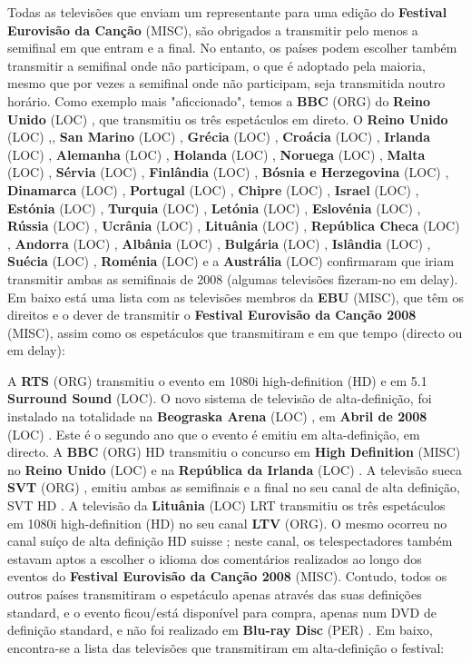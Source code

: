 \documentclass[12pt,a4paper]{article}
\begin{document}
Todas as televisões que enviam um representante para uma edição do \textbf{Festival Eurovisão da Canção} (MISC), são obrigados a transmitir pelo menos a semifinal em que entram e a final. No entanto, os países podem escolher também transmitir a semifinal onde não participam, o que é adoptado pela maioria, mesmo que por vezes a semifinal onde não participam, seja transmitida noutro horário. Como exemplo mais "aficcionado", temos a \textbf{BBC} (ORG) do \textbf{Reino Unido} (LOC) , que transmitiu os três espetáculos em direto. O \textbf{Reino Unido} (LOC) ,, \textbf{San Marino} (LOC) , \textbf{Grécia} (LOC) , \textbf{Croácia} (LOC) , \textbf{Irlanda} (LOC) , \textbf{Alemanha} (LOC) , \textbf{Holanda} (LOC) , \textbf{Noruega} (LOC) , \textbf{Malta} (LOC) , \textbf{Sérvia} (LOC) , \textbf{Finlândia} (LOC) , \textbf{Bósnia e Herzegovina} (LOC) , \textbf{Dinamarca} (LOC) , \textbf{Portugal} (LOC) , \textbf{Chipre} (LOC) , \textbf{Israel} (LOC) , \textbf{Estónia} (LOC) , \textbf{Turquia} (LOC) , \textbf{Letónia} (LOC) , \textbf{Eslovénia} (LOC) , \textbf{Rússia} (LOC) , \textbf{Ucrânia} (LOC) , \textbf{Lituânia} (LOC) , \textbf{República Checa} (LOC) , \textbf{Andorra} (LOC) , \textbf{Albânia} (LOC) , \textbf{Bulgária} (LOC) , \textbf{Islândia} (LOC) , \textbf{Suécia} (LOC) , \textbf{Roménia} (LOC) e a \textbf{Austrália} (LOC) confirmaram que iriam transmitir ambas as semifinais de 2008 (algumas televisões fizeram-no em delay). Em baixo está uma lista com as televisões membros da \textbf{EBU} (MISC), que têm os direitos e o dever de transmitir o \textbf{Festival Eurovisão da Canção 2008} (MISC), assim como os espetáculos que transmitiram e em que tempo (directo ou em delay):

A \textbf{RTS} (ORG) transmitiu o evento em 1080i high-definition (HD) e em 5.1 \textbf{Surround Sound} (LOC). O novo sistema de televisão de alta-definição, foi instalado na totalidade na \textbf{Beograska Arena} (LOC) , em \textbf{Abril de 2008} (LOC) . Este é o segundo ano que o evento é emitiu em alta-definição, em directo. A \textbf{BBC} (ORG) HD transmitiu o concurso em \textbf{High Definition} (MISC) no \textbf{Reino Unido} (LOC) e na \textbf{República da Irlanda} (LOC) . A televisão sueca \textbf{SVT} (ORG) , emitiu ambas as semifinais e a final no seu canal de alta definição, SVT HD . A televisão da \textbf{Lituânia} (LOC) LRT transmitiu os três espetáculos em 1080i high-definition (HD) no seu canal \textbf{LTV} (ORG). O mesmo ocorreu no canal suíço de alta definição HD suisse ; neste canal, os telespectadores também estavam aptos a escolher o idioma dos comentários realizados ao longo dos eventos do \textbf{Festival Eurovisão da Canção 2008} (MISC). Contudo, todos os outros países transmitiram o espetáculo apenas através das suas definições standard, e o evento ficou/está disponível para compra, apenas num DVD de definição standard, e não foi realizado em \textbf{Blu-ray Disc} (PER) . Em baixo, encontra-se a lista das televisões que transmitiram em alta-definição o festival:
\end{document}
